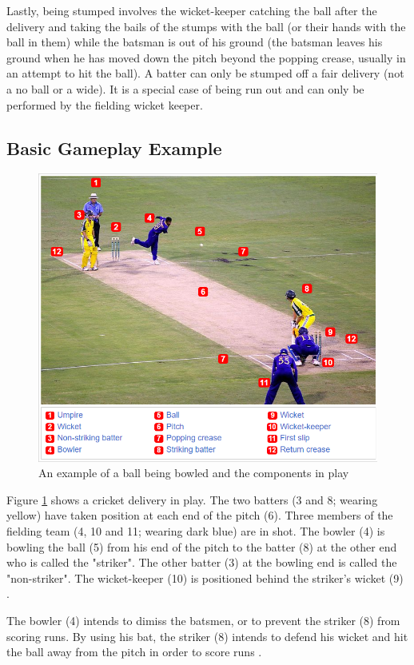 \documentclass[12pt,a4paper]{report}
\theoremstyle{definition}
\begin{document}
Lastly, being stumped involves the wicket-keeper catching the ball after the delivery and taking the bails of the stumps with the ball (or their hands with the ball in them) while the batsman is out of his ground (the batsman leaves his ground when he has moved down the pitch beyond the popping crease, usually in an attempt to hit the ball).
A batter can only be stumped off a fair delivery (not a no ball or a wide).
It is a special case of being run out and can only be performed by the fielding wicket keeper.

\subsection{Basic Gameplay Example}

\begin{figure}[H]
    \centering
    \includegraphics[width=0.8\linewidth]{Cricket_Delivery.png}
    \caption{An example of a ball being bowled and the components in play \citep{cricketWiki}}
    \label{fig:Delivery}
\end{figure}

Figure \ref{fig:Delivery} shows a cricket delivery in play. 
The two batters (3 and 8; wearing yellow) have taken position at each end of the pitch (6). 
Three members of the fielding team (4, 10 and 11; wearing dark blue) are in shot. 
The bowler (4) is bowling the ball (5) from his end of the pitch to the batter (8) at the other end who is called the "striker". 
The other batter (3) at the bowling end is called the "non-striker". 
The wicket-keeper (10) is positioned behind the striker's wicket (9) \citep{cricketWiki}.

The bowler (4) intends to dimiss the batsmen, or to prevent the striker (8) from scoring runs. 
By using his bat, the striker (8) intends to defend his wicket and hit the ball away from the pitch in order to score runs \citep{cricketWiki}.
\end{document}
